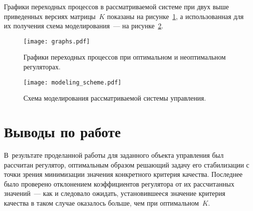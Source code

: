 Графики переходных процессов в рассматриваемой системе при двух выше приведенных версиях матрицы~$K$ показаны на рисунке~\ref{img_graphs},
а использованная для их получения схема моделирования~--- на рисунке~\ref{img_modeling_scheme}.

\begin{figure}[h!]
    \centering
    \texttt{[image: graphs.pdf]}
    \vspace{0cm}
    \caption{Графики переходных процессов при оптимальном и неоптимальном регуляторах.}
    \label{img_graphs}
\end{figure}

\begin{figure}[h!]
    \centering
    \texttt{[image: modeling\_scheme.pdf]}
    \vspace{0.5cm}
    \caption{Схема моделирования рассматриваемой системы управления.}
    \label{img_modeling_scheme}
\end{figure}


\newpage


\section{Выводы по работе}
В~результате проделанной работы для заданного объекта управления был рассчитан регулятор, оптимальным образом решающий задачу его стабилизации с точки зрения минимизации значения конкретного критерия качества.
Последнее было проверено отклонением коэффициентов регулятора от их рассчитанных значений~--- как и следовало ожидать, установившееся значение критерия качества в таком случае оказалось больше, чем при оптимальном~$K$.
